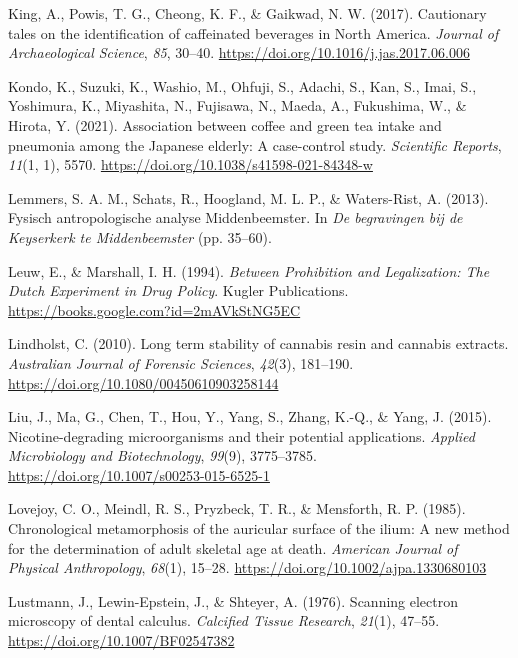 \documentclass[
  11pt,
  leqno]{scrartcl}
\newlength{\cslhangindent}
\newenvironment{CSLReferences}[2] %
 {\begin{list}{}{%
  \setlength{\itemindent}{0pt}
  \setlength{\leftmargin}{0pt}
  \setlength{\parsep}{0pt}
  \ifodd #1
   \setlength{\leftmargin}{\cslhangindent}
   \setlength{\itemindent}{-1\cslhangindent}
  \fi
  \setlength{\itemsep}{#2\baselineskip}}}
 {\end{list}}
\begin{document}
\begin{CSLReferences}{1}{0}
King, A., Powis, T. G., Cheong, K. F., \& Gaikwad, N. W. (2017).
Cautionary tales on the identification of caffeinated beverages in
{North America}. \emph{Journal of Archaeological Science}, \emph{85},
30--40. \url{https://doi.org/10.1016/j.jas.2017.06.006}

Kondo, K., Suzuki, K., Washio, M., Ohfuji, S., Adachi, S., Kan, S.,
Imai, S., Yoshimura, K., Miyashita, N., Fujisawa, N., Maeda, A.,
Fukushima, W., \& Hirota, Y. (2021). Association between coffee and
green tea intake and pneumonia among the {Japanese} elderly: A
case-control study. \emph{Scientific Reports}, \emph{11}(1, 1), 5570.
\url{https://doi.org/10.1038/s41598-021-84348-w}

Lemmers, S. A. M., Schats, R., Hoogland, M. L. P., \& Waters-Rist, A.
(2013). Fysisch antropologische analyse Middenbeemster. In \emph{De
begravingen bij de Keyserkerk te Middenbeemster} (pp. 35--60).

Leuw, E., \& Marshall, I. H. (1994). \emph{Between {Prohibition} and
{Legalization}: {The Dutch Experiment} in {Drug Policy}}. {Kugler
Publications}. \url{https://books.google.com?id=2mAVkStNG5EC}

Lindholst, C. (2010). Long term stability of cannabis resin and cannabis
extracts. \emph{Australian Journal of Forensic Sciences}, \emph{42}(3),
181--190. \url{https://doi.org/10.1080/00450610903258144}

Liu, J., Ma, G., Chen, T., Hou, Y., Yang, S., Zhang, K.-Q., \& Yang, J.
(2015). Nicotine-degrading microorganisms and their potential
applications. \emph{Applied Microbiology and Biotechnology},
\emph{99}(9), 3775--3785.
\url{https://doi.org/10.1007/s00253-015-6525-1}

Lovejoy, C. O., Meindl, R. S., Pryzbeck, T. R., \& Mensforth, R. P.
(1985). Chronological metamorphosis of the auricular surface of the
ilium: {A} new method for the determination of adult skeletal age at
death. \emph{American Journal of Physical Anthropology}, \emph{68}(1),
15--28. \url{https://doi.org/10.1002/ajpa.1330680103}

Lustmann, J., Lewin-Epstein, J., \& Shteyer, A. (1976). Scanning
electron microscopy of dental calculus. \emph{Calcified Tissue
Research}, \emph{21}(1), 47--55.
\url{https://doi.org/10.1007/BF02547382}


\end{CSLReferences}
\end{document}
